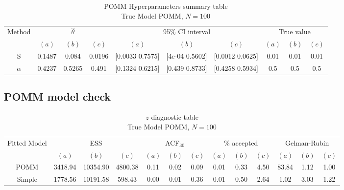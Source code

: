 \documentclass[11pt]{amsart}
\begin{document}
\begin{table}[htbp]
\centering
\caption*{
{\large POMM Hyperparameters summary table} \\ 
{\small True Model POMM, $N=100$}
} 
\begin{tabular}{cccccccccc}
\toprule
\multirow{2}{*}{Method} & \multicolumn{3}{c}{
$\hat{\theta}$} & \multicolumn{3}{c}{
95$\%$ CI interval} & \multicolumn{3}{c}{True value} \\
\cmidrule(lr){2-4} \cmidrule(lr){5-7} \cmidrule(lr){8-10}
& $(a)$ & $(b)$ & $(c)$ & $(a)$ & $(b)$ & $(c)$ & $(a)$ & $(b)$ & $(c)$ \\
\midrule
S  &0.1487 & 0.084 & 0.0196 & [0.0033	0.7575] & [4e-04	0.5602] & [0.0012	0.0625] & 0.01 & 0.01 & 0.01   \\
$\alpha$ & 0.4237 & 0.5265 & 0.491 & [0.1324	0.6215] & [0.439	0.8733] & [0.4258	0.5934] & 0.5 & 0.5 & 0.5 \\
\bottomrule
\end{tabular}
\label{table:simulations_from_simple}
\end{table}


\subsection{POMM model check}



\begin{table}[htbp]
\centering
\caption*{
{\large $z$ diagnostic table} \\ 
{\small True Model POMM, $N=100$}
} 
\begin{tabular}{ccccccccccccc}
\toprule
\multirow{2}{*}{Fitted Model} & \multicolumn{3}{c}{ESS} & \multicolumn{3}{c}{
ACF$_{30}$} & \multicolumn{3}{c}{$\%$ accepted} & \multicolumn{3}{c}{Gelman-Rubin}\\
\cmidrule(lr){2-4} \cmidrule(lr){5-7} \cmidrule(lr){8-10} \cmidrule(lr){11-13} 
& $(a)$ & $(b)$ & $(c)$ & $(a)$ & $(b)$ & $(c)$ & $(a)$ & $(b)$ & $(c)$ & $(a)$ & $(b)$ & $(c)$ \\
\midrule
POMM &3418.94 & 10354.90 & 4800.38 & 0.11 & 0.02 & 0.09 & 0.01 & 0.33 & 4.50 & 83.84 & 1.12 & 1.00    \\
Simple &1778.56 & 10191.58 & 598.43 & 0.00 & 0.01 & 0.36 & 0.01 & 0.50 & 2.64 & 1.02 & 3.03 & 1.22  \\
\bottomrule
\end{tabular}
\label{table:simulations_from_simple}
\end{table}
\end{document}
